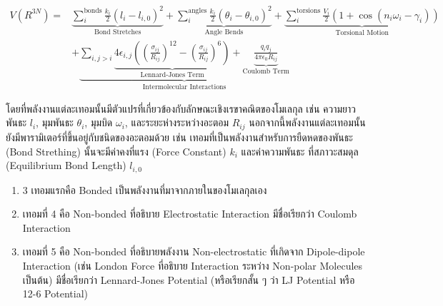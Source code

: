 \begin{equation}
    \begin{aligned}
        V\left(R^{3N}\right)
        = & \underbrace{
            \sum^{\text{bonds}}_{i} \frac{k_{i}}{2} (l_{i} - l_{i,0})^{2}
        }_
        {
            \text{Bond Stretches}
        }
        +
        \underbrace{
            \sum^{\text{angles}}_{i} \frac{k_{i}}{2} (\theta_{i} - \theta_{i,0})^{2}
        }_
        {
            \text{Angle Bends}
        }
        +
        \underbrace{
            \sum^{\text{torsions}}_{i} \frac{V_{i}}{2} (1 + \cos(n_{i} \omega_{i} - \gamma_{i}))
        }_
        {
            \text{Torsional Motion}
        }                  \\
          & + \underbrace{
            \sum_{i,j > i}
            \underbrace{
                4 \epsilon_{i,j}
                \left(
                \left( \frac{\sigma_{ij}}{R_{ij}} \right)^{12}
                - \left( \frac{\sigma_{ij}}{R_{ij}} \right)^{6}
                \right)
            }_
            {
                \text{Lennard-Jones Term}
            }
            +
            \underbrace
            {
                \frac{q_{i} q_{j}}{4 \pi \epsilon_{0} R_{ij}}
            }_
            {
                \text{Coulomb Term}
            }
        }_
        {
            \text{Intermolecular Interactions}
        }
    \end{aligned}
\end{equation}

โดยที่พลังงานแต่ละเทอมนั้นมีตัวแปรที่เกี่ยวข้องกับลักษณะเชิงเรขาคณิตของโมเลกุล เช่น ความยาวพันธะ $l_{i}$, มุมพันธะ $\theta_{i}$,
มุมบิด $\omega_{i}$, และระยะห่างระหว่างอะตอม $R_{ij}$ นอกจากนี้พลังงานแต่ละเทอมนั้นยังมีพารามิเตอร์ที่ขึ้นอยู่กับชนิดของอะตอมด้วย
เช่น เทอมที่เป็นพลังงานสำหรับการยืดหดของพันธะ (Bond Strething) นั้นจะมีค่าคงที่แรง (Force Constant) $k_{i}$ และค่าความพันธะ%
ที่สภาวะสมดุล (Equilibrium Bond Length) $l_{i,0}$

\begin{enumerate}[topsep=0pt,noitemsep]
    \setlength\itemsep{1em}
    \item 3 เทอมแรกคือ Bonded เป็นพลังงานที่มาจากภายในของโมเลกุลเอง

    \item เทอมที่ 4 คือ Non-bonded ที่อธิบาย Electrostatic Interaction มีชื่อเรียกว่า Coulomb Interaction

    \item เทอมที่ 5 คือ Non-bonded ที่อธิบายพลังงาน Non-electrostatic ที่เกิดจาก Dipole-dipole Interaction
          (เช่น London Force ที่อธิบาย Interaction ระหว่าง Non-polar Molecules เป็นต้น) มีชื่อเรียกว่า Lennard-Jones Potential
          (หรือเรียกสั้น ๆ ว่า LJ Potential หรือ 12-6 Potential)

\end{enumerate}


